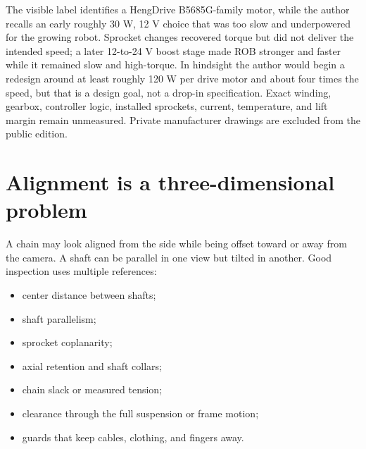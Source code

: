 \documentclass[11pt,openany]{book}
\begin{document}
\begin{fieldnotebox}[title={THE UNDERPOWERED-MOTOR LESSON}]
The visible label identifies a HengDrive B5685G-family motor, while the author recalls an early roughly 30 W, 12 V choice that was too slow and underpowered for the growing robot. Sprocket changes recovered torque but did not deliver the intended speed; a later 12-to-24 V boost stage made ROB stronger and faster while it remained slow and high-torque. In hindsight the author would begin a redesign around at least roughly 120 W per drive motor and about four times the speed, but that is a design goal, not a drop-in specification. Exact winding, gearbox, controller logic, installed sprockets, current, temperature, and lift margin remain unmeasured. Private manufacturer drawings are excluded from the public edition.
\end{fieldnotebox}


\clearpage
\section*{Alignment is a three-dimensional problem}

A chain may look aligned from the side while being offset toward or away from the camera. A shaft can be parallel in one view but tilted in another. Good inspection uses multiple references:

\begin{itemize}
  \item center distance between shafts;
  \item shaft parallelism;
  \item sprocket coplanarity;
  \item axial retention and shaft collars;
  \item chain slack or measured tension;
  \item clearance through the full suspension or frame motion;
  \item guards that keep cables, clothing, and fingers away.
\end{itemize}

\end{document}
